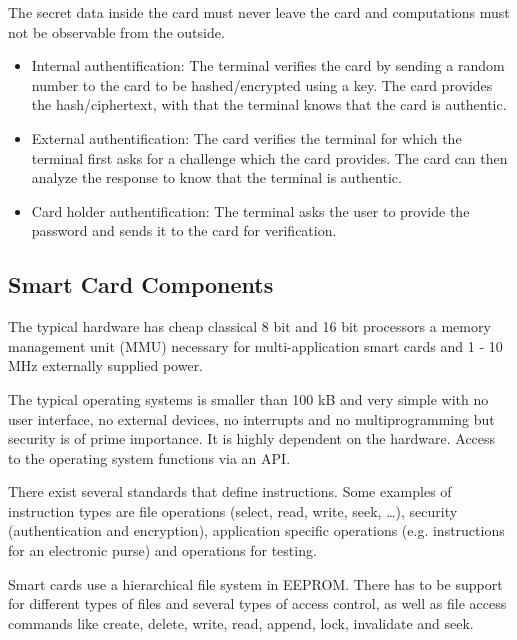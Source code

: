 \begin{myremark} The secret data inside the card must never leave the card and computations must not be observable from the outside.
\end{myremark}
\begin{mytitle} \hfill
\begin{itemize}
    \item Internal authentification: The terminal verifies the card by sending a random number to the card to be hashed/encrypted using a key. The card provides the hash/ciphertext, with that the terminal knows that the card is authentic.
    \item External authentification: The card verifies the terminal for which the terminal first asks for a challenge which the card provides. The card can then analyze the response to know that the terminal is authentic. 
    \item Card holder authentification: The terminal asks the user to provide the password and sends it to the card for verification.
\end{itemize} 
\end{mytitle}
\subsection{Smart Card Components}
\begin{mytitle} The typical hardware has cheap classical 8 bit and 16 bit processors a memory management unit (MMU) necessary for multi-application smart cards and 1 - 10 MHz externally supplied power.
\end{mytitle}
\begin{mytitle} The typical operating systems is smaller than 100 kB and very simple with no user interface, no external devices, no interrupts and no multiprogramming but security is of prime importance. It is highly dependent on the hardware. Access to the operating system functions via an API.
\end{mytitle}
\begin{mytitle} There exist several standards that define instructions. Some examples of instruction types are file operations (select, read, write, seek, \ldots), security (authentication and encryption), application specific operations (e.g. instructions for an electronic purse) and operations for testing.
\end{mytitle}
\begin{mytitle} Smart cards use a hierarchical file system in EEPROM. There has to be support for different types of files and several types of access control, as well as file access commands like create, delete, write, read, append, lock, invalidate and seek.
\end{mytitle}


